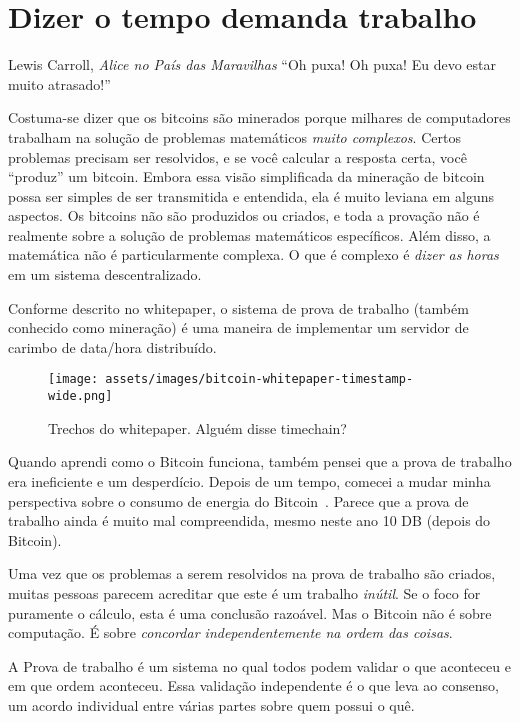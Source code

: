 \chapter{Dizer o tempo demanda trabalho}
\label{les:17}

\begin{chapquote}{Lewis Carroll, \textit{Alice no País das Maravilhas}}
\enquote{Oh puxa! Oh puxa! Eu devo estar muito atrasado!}
\end{chapquote}

Costuma-se dizer que os bitcoins são minerados porque milhares de computadores trabalham na solução de problemas matemáticos \textit{muito complexos}. Certos problemas precisam ser resolvidos, e se você calcular a resposta certa, você \enquote{produz} um bitcoin. Embora essa visão simplificada da mineração de bitcoin possa ser simples de ser transmitida e entendida, ela é muito leviana em alguns aspectos. Os bitcoins não são produzidos ou criados, e toda a provação não é realmente sobre a solução de problemas matemáticos específicos. Além disso, a matemática não é particularmente complexa. O que é complexo é \textit{dizer as horas} em um sistema descentralizado.

Conforme descrito no whitepaper, o sistema de prova de trabalho (também conhecido como mineração) é uma maneira de implementar um servidor de carimbo de data/hora distribuído.

\begin{figure}
  \texttt{[image: assets/images/bitcoin-whitepaper-timestamp-wide.png]}
  \caption{Trechos do whitepaper. Alguém disse timechain?}
  \label{fig:bitcoin-whitepaper-timestamp-wide}
\end{figure}

Quando aprendi como o Bitcoin funciona, também pensei que a prova de trabalho era ineficiente e um desperdício. Depois de um tempo, comecei a mudar minha perspectiva sobre o consumo de energia do Bitcoin~\cite{gigi:energy}. Parece que a prova de trabalho ainda é muito mal compreendida, mesmo neste ano 10 DB (depois do Bitcoin).

Uma vez que os problemas a serem resolvidos na prova de trabalho são criados, muitas pessoas parecem acreditar que este é um trabalho \textit{inútil}. Se o foco for puramente o cálculo, esta é uma conclusão razoável. Mas o Bitcoin não é sobre computação. É sobre \textit{concordar independentemente na ordem das coisas}.

A Prova de trabalho é um sistema no qual todos podem validar o que aconteceu e em que ordem aconteceu. Essa validação independente é o que leva ao consenso, um acordo individual entre várias partes sobre quem possui o quê.

